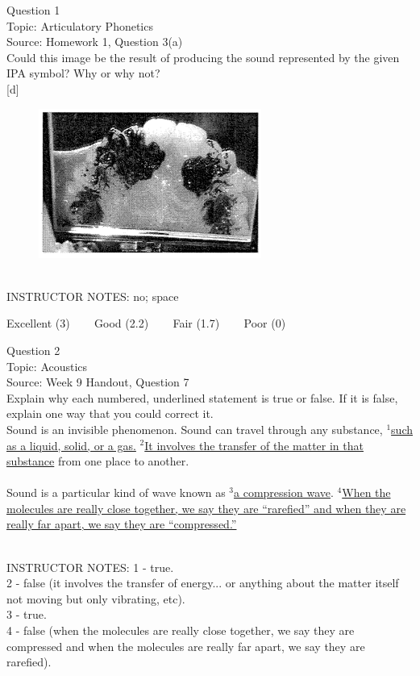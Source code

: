 \documentclass[12pt]{article}
\begin{document}
{\large Question 1}\\

Topic: Articulatory Phonetics\\
Source: Homework 1, Question 3(a)\\

Could this image be the result of producing the sound represented by the given IPA symbol? Why or why not?\\

{[d]}

\begin{figure}[H]
\includegraphics{../images/staticpalatography_fricative.png}
\end{figure}

~\\
INSTRUCTOR NOTES: no; space


\vfill
Excellent (3) ~~~ Good (2.2) ~~~ Fair (1.7) ~~~ Poor (0)
\newpage

{\large Question 2}\\

Topic: Acoustics\\
Source: Week 9 Handout, Question 7\\

Explain why each numbered, underlined statement is true or false. If it is false, explain one way that you could correct it.\\

Sound is an invisible phenomenon. Sound can travel through any substance, $^1$\ul{such as a liquid, solid, or a gas.} $^2$\ul{It involves the transfer of the matter in that substance} from one place to another.\\\\Sound is a particular kind of wave known as $^3$\ul{a compression wave}. $^4$\ul{When the molecules are really close together, we say they are ``rarefied'' and when they are really far apart, we say they are ``compressed.''}


~\\
INSTRUCTOR NOTES: 1 - true.\\2 - false (it involves the transfer of energy... or anything about the matter itself not moving but only vibrating, etc). \\3 - true.\\4 - false (when the molecules are really close together, we say they are compressed and when the molecules are really far apart, we say they are rarefied).
\end{document}
